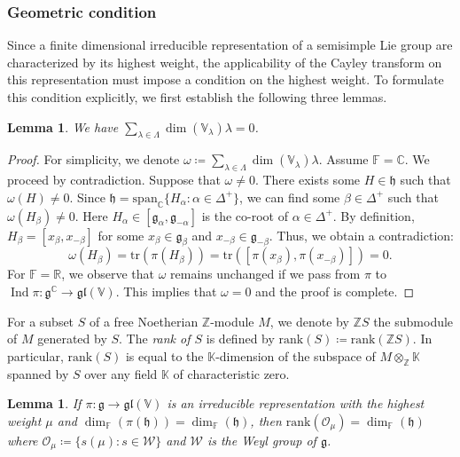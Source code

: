 \documentclass[11pt,reqno]{amsart}
\DeclareMathOperator{\Ind}{Ind}
\newtheorem{lemma}[theorem]{Lemma}
\newcommand{\rank}{\mathrm{rank}} %
\newcommand{\RR}{\mathbb{R}} %
\newcommand{\CC}{\mathbb{C}} %
\newcommand{\FF}{\mathbb{F}} %
\newcommand{\ZZ}{\mathbb{Z}} %
\newcommand{\spn}{\mathrm{span}}
\newcommand{\W}{\mathcal{W}}
\newcommand{\tr}{\mathrm{tr}}
\begin{document}
\subsubsection{Geometric condition} Since a finite dimensional irreducible  representation of a semisimple Lie group are characterized by its highest weight,  the applicability of the Cayley transform on this representation must impose a condition on the highest weight.  To formulate this condition explicitly,  we first establish the following three lemmas. 
\begin{lemma}\label{prop: balance weights}
We have $\sum_{\lambda \in \Lambda} \dim ( \mathbb{V}_\lambda)\lambda =0$.
\end{lemma}
\begin{proof}
For simplicity,  we denote $\omega  \coloneqq  \sum_{\lambda \in \Lambda} \dim ( \mathbb{V}_\lambda)\lambda$.  Assume $\FF=\CC$.  We proceed by contradiction.  Suppose that $\omega  \ne 0$.  There exists some $H\in \mathfrak{h}$ such that $\omega  (H) \ne 0$.  Since $\mathfrak{h} = \spn_{\CC} \{ H_{\alpha}: \alpha \in \Delta^+ \}$,  we can find some $\beta \in \Delta^+$ such that $\omega (H_{\beta}) \ne 0$.  Here $H_{\alpha} \in [\mathfrak{g}_{\alpha},  \mathfrak{g}_{-\alpha}]$ is the co-root of $\alpha \in \Delta^+$.  By definition,  $H_{\beta} = [x_{\beta},  x_{-\beta}]$ for some $x_{\beta} \in \mathfrak{g}_{\beta}$ and $x_{-\beta} \in \mathfrak{g}_{-\beta}$.  Thus,  we obtain a contradiction: 
\[
\omega  (H_{\beta}) = \tr (\pi (H_{\beta})) = \tr\left( [\pi(x_\beta),  \pi(x_{-\beta})]  \right)= 0.
\]
For $\FF=\RR$,  we observe that $\omega$ remains unchanged if we pass from $\pi$ to  $\Ind \pi: \mathfrak{g}^{\mathbb{C}} \to \mathfrak{gl}(\mathbb{V})$.  This implies that $\omega = 0$ and the proof is complete.
\end{proof}
For a subset $S$ of a free Noetherian $\mathbb{Z}$-module $M$,  we denote by $\mathbb{Z} S$ the submodule of $M$ generated by $S$.  The \emph{rank of $S$} is defined by $\rank(S) \coloneqq \rank (\mathbb{Z} S)$.  In particular,  $\rank (S)$ is equal to the $\mathbb{K}$-dimension of the subspace of $M\otimes_{\ZZ} \mathbb{K}$ spanned by $S$ over any field $\mathbb{K}$ of characteristic zero.
\begin{lemma}\label{lem:rank-orbit}
If $\pi: \mathfrak{g} \to \mathfrak{gl}(\mathbb{V})$ is an irreducible representation with the highest weight $\mu$ and $\dim_\FF (\pi(\mathfrak{h}))= \dim_\FF(\mathfrak{h})$,  then $\rank ( \mathcal{O}_\mu ) = \dim_\FF(\mathfrak{h})$ where $\mathcal{O}_\mu \coloneqq \{s(\mu): s\in \W \}$ and $\W$ is the Weyl group of $\mathfrak{g}$.
\end{lemma}
\end{document}

